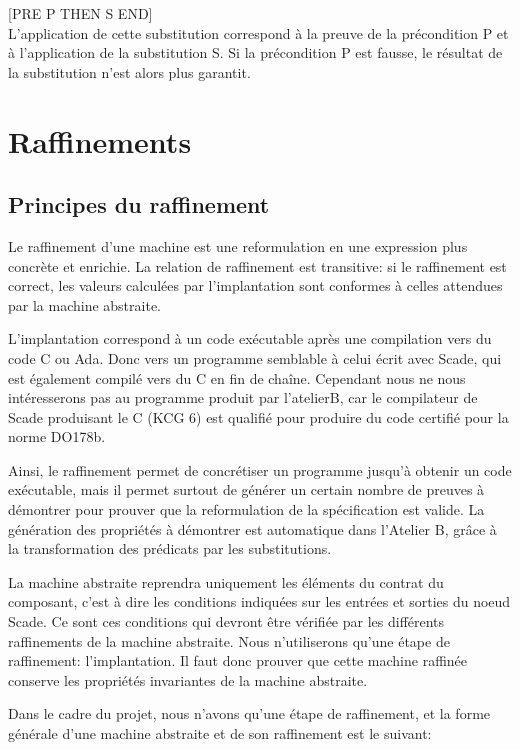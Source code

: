 [PRE P THEN S END]\\
L'application de cette substitution correspond à la preuve de la
précondition P et à l'application de la substitution S. Si la
précondition P est fausse, le résultat de la substitution n'est alors
plus garantit.


\section{Raffinements}

\subsection{Principes du raffinement}

Le raffinement d'une machine est une reformulation en une
expression plus concrète et enrichie. La relation de raffinement est transitive:
si le raffinement est correct, les valeurs calculées par l'implantation sont
conformes à celles attendues par la machine abstraite.

L'implantation correspond à un code exécutable après une compilation vers du
code C ou Ada. Donc vers un programme semblable à celui écrit avec
Scade, qui est également compilé vers du C en fin de chaîne. Cependant
nous ne nous intéresserons pas au programme produit par l'atelierB,
car le compilateur de Scade produisant le C (KCG 6) est qualifié pour produire
du code certifié pour la norme DO178b.

Ainsi, le raffinement permet de concrétiser un programme jusqu'à obtenir un code
exécutable, mais il permet surtout de générer un certain nombre de preuves à
démontrer pour prouver que la reformulation de la spécification est valide.
La génération des propriétés à démontrer est automatique dans l'Atelier B, grâce à la
transformation des prédicats par les substitutions. 

La machine abstraite reprendra uniquement les éléments du contrat du composant,
c'est à dire les conditions indiquées sur les entrées et sorties du noeud
Scade. Ce sont ces conditions qui devront être vérifiée par les différents
raffinements de la machine abstraite. Nous n'utiliserons qu'une étape de
raffinement: l'implantation. Il faut donc prouver que cette machine raffinée
conserve les propriétés invariantes de la machine abstraite.

Dans le cadre du projet, nous n'avons qu'une étape de raffinement, et la forme
générale d'une machine abstraite et de son raffinement est le suivant: 
\newpage


